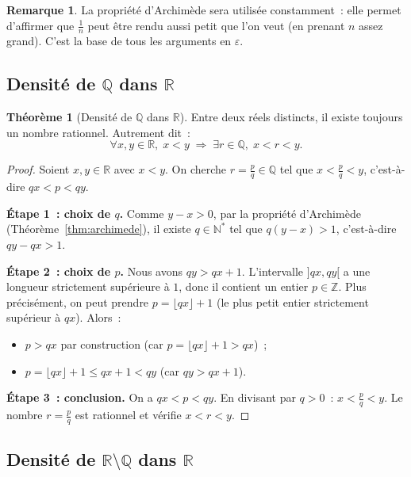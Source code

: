 \documentclass[12pt,a4paper,openany]{book}
\theoremstyle{definition}
\newtheorem{theoreme}{Théorème}[chapter]
\newtheorem{remarque}{Remarque}[chapter]
\newcommand{\N}{\mathbb{N}}
\newcommand{\Z}{\mathbb{Z}}
\newcommand{\Q}{\mathbb{Q}}
\newcommand{\R}{\mathbb{R}}
\newcommand{\eps}{\varepsilon}
\begin{document}
\begin{remarque}\label{rem:archimede-utile}
  La propriété d'Archimède sera utilisée constamment~: elle permet d'affirmer que $\frac{1}{n}$ peut être rendu aussi petit que l'on veut (en prenant $n$ assez grand). C'est la base de tous les arguments en $\eps$.
\end{remarque}

\subsection{Densité de $\Q$ dans $\R$}
\index{densité de $\Q$ dans $\R$}

\begin{theoreme}[Densité de $\Q$ dans $\R$]\label{thm:densite-Q}
  Entre deux réels distincts, il existe toujours un nombre rationnel. Autrement dit~:
  \[
    \forall x, y \in \R,\; x < y \;\Rightarrow\; \exists r \in \Q,\; x < r < y.
  \]
\end{theoreme}

\begin{proof}
  Soient $x, y \in \R$ avec $x < y$. On cherche $r = \frac{p}{q} \in \Q$ tel que $x < \frac{p}{q} < y$, c'est-à-dire $qx < p < qy$.

  \textbf{Étape 1~: choix de $q$.} Comme $y - x > 0$, par la propriété d'Archimède (Théorème~\ref{thm:archimede}), il existe $q \in \N^*$ tel que $q(y - x) > 1$, c'est-à-dire $qy - qx > 1$.

  \textbf{Étape 2~: choix de $p$.} Nous avons $qy > qx + 1$. L'intervalle $]qx, qy[$ a une longueur strictement supérieure à $1$, donc il contient un entier $p \in \Z$. Plus précisément, on peut prendre $p = \lfloor qx \rfloor + 1$ (le plus petit entier strictement supérieur à $qx$). Alors~:
  \begin{itemize}
    \item $p > qx$ par construction (car $p = \lfloor qx \rfloor + 1 > qx$)~;
    \item $p = \lfloor qx \rfloor + 1 \leq qx + 1 < qy$ (car $qy > qx + 1$).
  \end{itemize}

  \textbf{Étape 3~: conclusion.} On a $qx < p < qy$. En divisant par $q > 0$~: $x < \frac{p}{q} < y$. Le nombre $r = \frac{p}{q}$ est rationnel et vérifie $x < r < y$.
\end{proof}

\subsection{Densité de $\R \setminus \Q$ dans $\R$}
\end{document}
